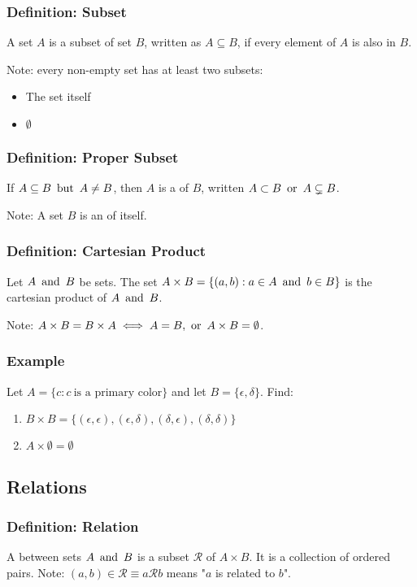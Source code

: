 \subsubsection*{Definition: Subset}
A set $A$ is a subset of set $B$, written as $A \subseteq B$, if every element of $A$ is also in $B$.

Note: every non-empty set has at least two subsets:
\begin{itemize}
    \item The set itself
    \item $\emptyset$
\end{itemize}

\subsubsection*{Definition: Proper Subset}
If $A \subseteq B \operatorname{~\text{but}~} A \not = B$, then $A$ is a  of $B$, written $A \subset B \operatorname{~\text{or}~} A \subsetneq B$.

Note: A set $B$ is an  of itself.

\subsubsection*{Definition: Cartesian Product}
Let $A \operatorname{~\text{and}~} B$ be sets. The set $A \times B = \{(a,b) : a \in A \operatorname{~\text{and}~} b \in B\}$ is the cartesian product of $A \operatorname{~\text{and}~} B$.

Note: $A \times B = B \times A \iff A = B, \operatorname{~\text{or}~} A \times B = \emptyset$.

\subsubsection*{Example}
Let $A = \{c : c ~\text{is a primary color}\}$ and let $B = \{\epsilon, \delta\}$. Find:
\begin{enumerate}
    \item $B \times B = \{(\epsilon, \epsilon),(\epsilon,\delta),(\delta,\epsilon),(\delta,\delta)\}$
    \item $A \times \emptyset = \emptyset$
\end{enumerate}

\subsection{Relations}

\subsubsection*{Definition: Relation}
A  between sets $A \operatorname{~\text{and}~} B$ is a subset $\mathcal{R}$ of $A \times B$. It is a collection of ordered pairs. Note: $(a,b) \in \mathcal{R} \equiv a\mathcal{R}b$ means "$a$ is related to $b$".

